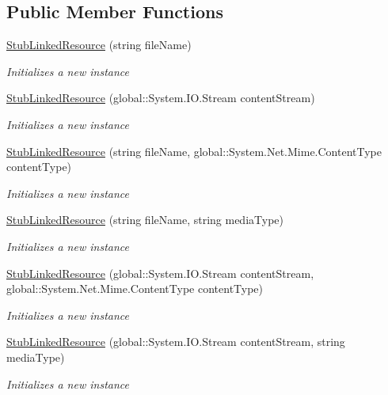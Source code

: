 \subsection*{Public Member Functions}
\begin{DoxyCompactItemize}
\item 
\hyperlink{class_system_1_1_net_1_1_mail_1_1_fakes_1_1_stub_linked_resource_a77fed1ba0ab133542ae96e6551f23140}{Stub\-Linked\-Resource} (string file\-Name)
\begin{DoxyCompactList}\small\item\em Initializes a new instance\end{DoxyCompactList}\item 
\hyperlink{class_system_1_1_net_1_1_mail_1_1_fakes_1_1_stub_linked_resource_a9ea6aad137acfe75624c804a75d869b9}{Stub\-Linked\-Resource} (global\-::\-System.\-I\-O.\-Stream content\-Stream)
\begin{DoxyCompactList}\small\item\em Initializes a new instance\end{DoxyCompactList}\item 
\hyperlink{class_system_1_1_net_1_1_mail_1_1_fakes_1_1_stub_linked_resource_aa18199769d6550d24fc1f72f29f63152}{Stub\-Linked\-Resource} (string file\-Name, global\-::\-System.\-Net.\-Mime.\-Content\-Type content\-Type)
\begin{DoxyCompactList}\small\item\em Initializes a new instance\end{DoxyCompactList}\item 
\hyperlink{class_system_1_1_net_1_1_mail_1_1_fakes_1_1_stub_linked_resource_a13c7a340f37462b6f854cedce70fe527}{Stub\-Linked\-Resource} (string file\-Name, string media\-Type)
\begin{DoxyCompactList}\small\item\em Initializes a new instance\end{DoxyCompactList}\item 
\hyperlink{class_system_1_1_net_1_1_mail_1_1_fakes_1_1_stub_linked_resource_aaa010036291a9aa2633366406b11661e}{Stub\-Linked\-Resource} (global\-::\-System.\-I\-O.\-Stream content\-Stream, global\-::\-System.\-Net.\-Mime.\-Content\-Type content\-Type)
\begin{DoxyCompactList}\small\item\em Initializes a new instance\end{DoxyCompactList}\item 
\hyperlink{class_system_1_1_net_1_1_mail_1_1_fakes_1_1_stub_linked_resource_a4b43d081531f168901d7c74976bb9dcf}{Stub\-Linked\-Resource} (global\-::\-System.\-I\-O.\-Stream content\-Stream, string media\-Type)
\begin{DoxyCompactList}\small\item\em Initializes a new instance\end{DoxyCompactList}\end{DoxyCompactItemize}
